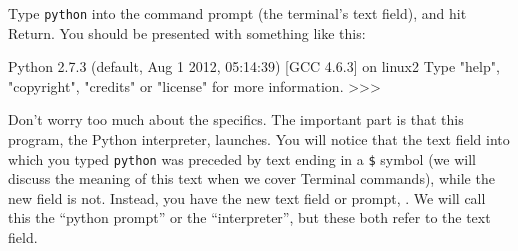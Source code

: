 Type \texttt{python} into the command prompt (the terminal's text field), and hit Return.
You should be presented with something like this:
\begin{codeblock}
Python 2.7.3 (default, Aug  1 2012, 05:14:39)
[GCC 4.6.3] on linux2
Type "help", "copyright", "credits" or "license" for more information.
>>>
\end{codeblock}
Don't worry too much about the specifics.
The important part is that this program, the Python interpreter, launches.
You will notice that the text field into which you typed \texttt{python} was preceded by text ending in a \texttt{\$} symbol (we will discuss the meaning of this text when we cover Terminal commands), while the new field is not.
Instead, you have the new text field or prompt, \pyprompt.
We will call this the ``python prompt'' or the ``interpreter'', but these both refer to the \pyprompt text field.
